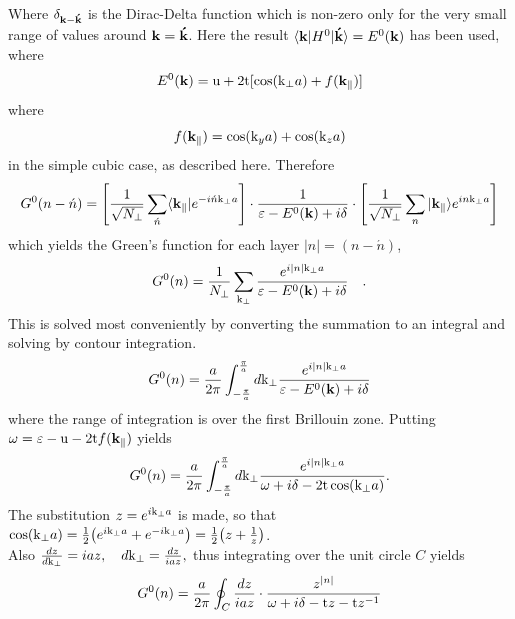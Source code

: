 \documentclass[a4paper, 12pt]{article}
\begin{document}
Where $\delta_{\bf k-\acute{k}}$ is the Dirac-Delta function which is non-zero only for the very small range of values around $\bf k = \acute{k}$. Here the result $\langle {\bf k}|H^0|{\bf \acute{k}} \rangle = E^0 ({\bf k}) $ has been used, where
\begin{equation}
	E^0 ({\bf k})={\rm{u}}+2{\rm{t}}[\cos({\rm{k}}_\perp a)+f({\bf k_\parallel})]
\end{equation}
where
\begin{equation}\label{disp}
	f({\bf k_\parallel}) = \cos({\rm{k}}_y a)+\cos({\rm{k}}_z a)
\end{equation}
in the simple cubic case, as described here. Therefore
\begin{equation}
	G^0(n - \acute{n}) = \left[ \frac{1}{\sqrt{N_\perp}}\sum_{\acute{n}} \langle{\bf k_\parallel}|e^{-i\acute{n}{\rm{k}}_\perp a}\right]\cdot \frac{1}{\varepsilon-E^0 ({\bf k}) +i\delta} \cdot \left[ \frac{1}{\sqrt{N_\perp}}\sum_n |{\bf k_\parallel}\rangle e^{in{\rm{k}}_\perp a}\right]
\end{equation}
which yields the Green's function for each layer $|n| = (n-\acute{n})$,
\begin{equation}
	G^0 (n) = \frac{1}{N_\perp}\sum_{{\rm{k}}_\perp} \frac{e^{i|n|{\rm{k}}_\perp a}}{\varepsilon-E^0 ({\bf k}) +i\delta} \quad .
\end{equation}
This is solved most conveniently by converting the summation to an integral and solving by contour integration.
\begin{equation}
	G^0 (n) = \frac{a}{2\pi}\int_{-\frac{\pi}{a}}^{\frac{\pi}{a}} {d{\rm{k}}_\perp} \frac{e^{i|n|{\rm{k}}_\perp a}}{\varepsilon-E^0 ({\bf k}) +i\delta}
\end{equation}
where the range of integration is over the first Brillouin zone. Putting $\omega = \varepsilon -{\rm u} -2{\rm t}f({\bf k_\parallel})$ yields
\begin{equation}
	G^0 (n) = \frac{a}{2\pi}\int_{-\frac{\pi}{a}}^{\frac{\pi}{a}} {d{\rm k}_\perp} \frac{e^{i|n|{\rm k}_\perp a}}{\omega +i\delta - 2{\rm t}\cos({\rm k}_\perp a)} .
\end{equation}
The substitution $z=e^{i{\rm k}_\perp a}$ is made, so that $\cos({\rm k}_\perp a) = \frac{1}{2}\big(e^{i{\rm k}_\perp a}+e^{-i{\rm k}_\perp a}\big)= \frac{1}{2}\big(z +\frac{1}{z}\big)$.
\\Also $\frac{dz}{d{\rm k}_\perp}=iaz , \quad d{\rm k}_\perp =\frac{dz}{iaz},$ thus integrating over the unit circle $C$ yields
\begin{equation}
	G^0 (n) = \frac{a}{2\pi}\oint_C \frac{dz}{iaz}\cdot \frac{z^{|n|}}{\omega +i\delta - {\rm t}z-{\rm t}z^{-1}} 
\end{equation}
\end{document}
